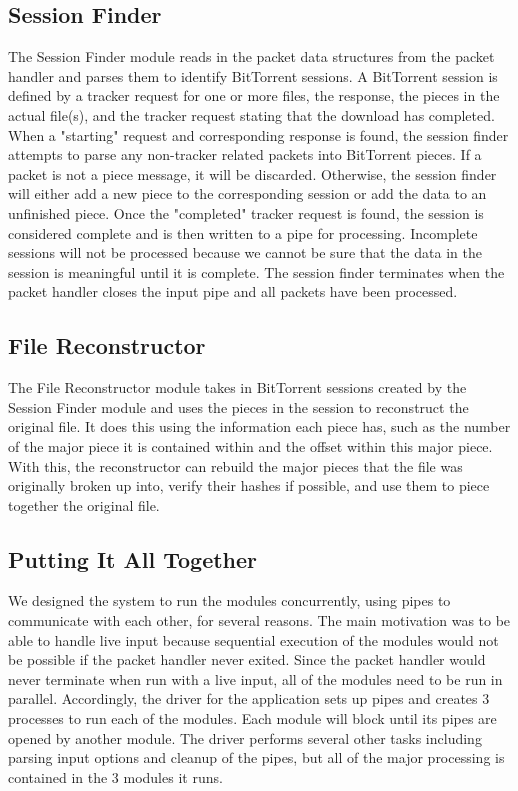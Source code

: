 \documentclass{acm_proc_article-sp}
\begin{document}
\subsection{Session Finder}
The Session Finder module reads in the packet data structures from the packet
handler and parses them to identify BitTorrent sessions. A BitTorrent session is
defined by a tracker request for one or more files, the response, the pieces in
the actual file(s), and the tracker request stating that the download has
completed. When a "starting" request and corresponding response is found, the
session finder attempts to parse any non-tracker related packets into BitTorrent
pieces. If a packet is not a piece message, it will be discarded. Otherwise, the
session finder will either add a new piece to the corresponding session or add
the data to an unfinished piece. Once the "completed" tracker request is found,
the session is considered complete and is then written to a pipe for
processing. Incomplete sessions will not be processed because we cannot be sure
that the data in the session is meaningful until it is complete. The session
finder terminates when the packet handler closes the input pipe and all packets
have been processed.

\subsection{File Reconstructor}
The File Reconstructor module takes in BitTorrent sessions created by the
Session Finder module and uses the pieces in the session to reconstruct the
original file.  It does this using the information each piece has, such as the
number of the major piece it is contained within and the offset within this
major piece.  With this, the reconstructor can rebuild the major pieces that
the file was originally broken up into, verify their hashes if possible, and
use them to piece together the original file.

\subsection{Putting It All Together}
We designed the system to run the modules concurrently, using pipes to
communicate with each other, for several reasons. The main motivation was to be
able to handle live input because sequential execution of the modules would not
be possible if the packet handler never exited. Since the packet handler would
never terminate when run with a live input, all of the modules need to be run in
parallel. Accordingly, the driver for the application sets up pipes and creates
3 processes to run each of the modules. Each module will block until its pipes
are opened by another module. The driver performs several other tasks including
parsing input options and cleanup of the pipes, but all of the major processing
is contained in the 3 modules it runs.
\end{document}
